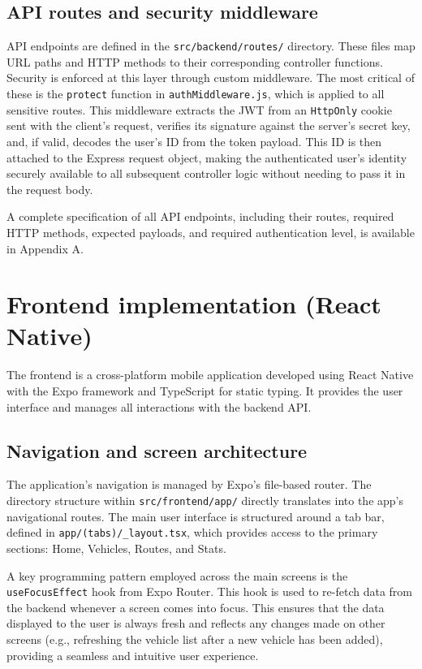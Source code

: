 \subsection{API routes and security middleware}
API endpoints are defined in the \texttt{src/backend/routes/} directory. These files map URL paths and HTTP methods to their corresponding controller functions. Security is enforced at this layer through custom middleware. The most critical of these is the \texttt{protect} function in \texttt{authMiddleware.js}, which is applied to all sensitive routes. This middleware extracts the JWT from an \texttt{HttpOnly} cookie sent with the client's request, verifies its signature against the server's secret key, and, if valid, decodes the user's ID from the token payload. This ID is then attached to the Express request object, making the authenticated user's identity securely available to all subsequent controller logic without needing to pass it in the request body.

\textgap

A complete specification of all API endpoints, including their routes, required HTTP methods, expected payloads, and required authentication level, is available in Appendix A.

\section{Frontend implementation (React Native)}

The frontend is a cross-platform mobile application developed using React Native with the Expo framework and TypeScript for static typing. It provides the user interface and manages all interactions with the backend API.

\subsection{Navigation and screen architecture}
The application's navigation is managed by Expo's file-based router. The directory structure within \texttt{src/frontend/app/} directly translates into the app's navigational routes. The main user interface is structured around a tab bar, defined in \texttt{app/(tabs)/\_layout.tsx}, which provides access to the primary sections: Home, Vehicles, Routes, and Stats.

\textgap

A key programming pattern employed across the main screens is the \\\texttt{useFocusEffect} hook from Expo Router. This hook is used to re-fetch data from the backend whenever a screen comes into focus. This ensures that the data displayed to the user is always fresh and reflects any changes made on other screens (e.g., refreshing the vehicle list after a new vehicle has been added), providing a seamless and intuitive user experience.

